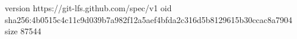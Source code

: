 version https://git-lfs.github.com/spec/v1
oid sha256:4b0515c4c11c9d039b7a982f12a5aef4bfda2c316d5b8129615b30ccac8a7904
size 87544
